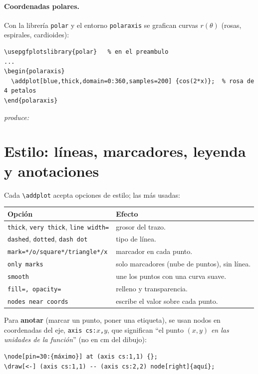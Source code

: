 \documentclass[11pt,a4paper]{article}
\newcommand{\C}[1]{\texttt{\textbackslash #1}}
\newcommand{\produce}{\par\smallskip\noindent\textit{produce:}\par\smallskip}
\begin{document}
\paragraph{Coordenadas polares.} Con la librería \texttt{polar} y el entorno
\texttt{polaraxis} se grafican curvas $r(\theta)$ (rosas, espirales, cardioides):
\begin{lstlisting}
\usepgfplotslibrary{polar}   % en el preambulo
...
\begin{polaraxis}
  \addplot[blue,thick,domain=0:360,samples=200] {cos(2*x)};  % rosa de 4 petalos
\end{polaraxis}
\end{lstlisting}
\produce
\begin{center}
\end{center}

\section{Estilo: líneas, marcadores, leyenda y anotaciones}
Cada \C{addplot} acepta opciones de estilo; las más usadas:
\begin{center}\small
\renewcommand{\arraystretch}{1.25}
\begin{tabularx}{\linewidth}{@{}l X@{}}
\toprule
\textbf{Opción} & \textbf{Efecto} \\
\midrule
\texttt{thick}, \texttt{very thick}, \texttt{line width=} & grosor del trazo. \\
\texttt{dashed}, \texttt{dotted}, \texttt{dash dot} & tipo de línea. \\
\texttt{mark=*/o/square*/triangle*/x} & marcador en cada punto. \\
\texttt{only marks} & solo marcadores (nube de puntos), sin línea. \\
\texttt{smooth} & une los puntos con una curva suave. \\
\texttt{fill=, opacity=} & relleno y transparencia. \\
\texttt{nodes near coords} & escribe el valor sobre cada punto. \\
\bottomrule
\end{tabularx}
\end{center}
Para \textbf{anotar} (marcar un punto, poner una etiqueta), se usan nodos en
coordenadas del eje, \texttt{axis cs:$x$,$y$}, que significan \enquote{el punto
$(x,y)$ \emph{en las unidades de la función}} (no en cm del dibujo):
\begin{lstlisting}
\node[pin=30:{máximo}] at (axis cs:1,1) {};
\draw[<-] (axis cs:1,1) -- (axis cs:2,2) node[right]{aquí};
\end{lstlisting}
\end{document}
